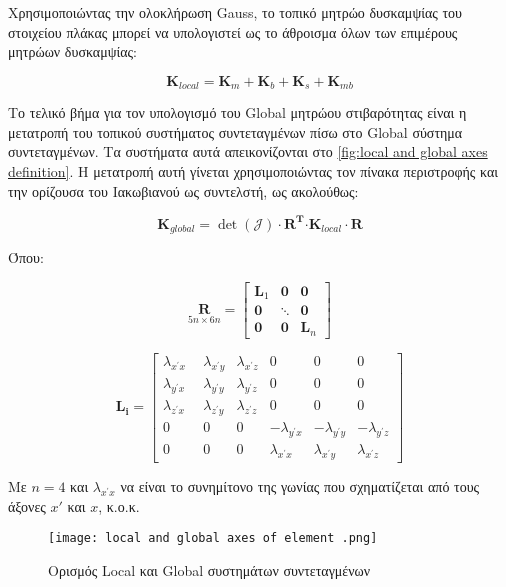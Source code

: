 Χρησιμοποιώντας την ολοκλήρωση \textlatin{Gauss}, το τοπικό μητρώο δυσκαμψίας του στοιχείου πλάκας μπορεί να υπολογιστεί ως το άθροισμα όλων των επιμέρους μητρώων δυσκαμψίας:

\begin{equation}
\mathbf{K}_{local} = \mathbf{K}_{m} + \mathbf{K}_{b} + \mathbf{K}_{s} + \mathbf{K}_{mb}
\end{equation}

Το τελικό βήμα για τον υπολογισμό του \textlatin{Global} μητρώου στιβαρότητας	είναι η μετατροπή του τοπικού συστήματος συντεταγμένων πίσω στο  \textlatin{Global} σύστημα συντεταγμένων. Τα συστήματα αυτά απεικονίζονται στο \autoref{fig:local and global axes definition}. H μετατροπή αυτή γίνεται χρησιμοποιώντας τον πίνακα περιστροφής και την ορίζουσα του Ιακωβιανού ως συντελστή, ως ακολούθως:

\begin{equation}
\mathbf{K}_{global} = \det\left( \mathcal{J} \right) \cdot \mathbf{R}^{\mathbf{T}}\mathbf{\cdot}\mathbf{K}_{local} \cdot \mathbf{R}
\end{equation}

Όπου:

\[
\underset{\text{$5n \times 6n$}}{\mathbf{R}} =
\begin{bmatrix}
\mathbf{L}_{1} & \mathbf{0} & \mathbf{0} \\
\mathbf{0} & \ddots & \mathbf{0} \\
\mathbf{0} & \mathbf{0} & \mathbf{L}_{n}
\end{bmatrix}
\]



\[\mathbf{L_i}=
\begin{bmatrix}
\lambda_{x^{'}x}\ \  & \lambda_{x^{'}y} & \lambda_{x^{'}z} & 0 & 0 & 0 \\
\lambda_{y^{'}x} & \lambda_{y^{'}y} & \lambda_{y^{'}z} & 0 & 0 & 0 \\
\lambda_{z^{'}x} & \lambda_{z^{'}y} & \lambda_{z^{'}z} & 0 & 0 & 0 \\
0 & 0 & 0 & - \lambda_{y^{'}x} & - \lambda_{y^{'}y} & - \lambda_{y^{'}z} \\
0 & 0 & 0 & \lambda_{x^{'}x} & \lambda_{x^{'}y} & \lambda_{x^{'}z}
\end{bmatrix}\]


Με $n = 4$ και $\lambda_{x^{'}x}$ να είναι το συνημίτονο της γωνίας που σχηματίζεται από τους άξονες $x'$ και $x$, κ.ο.κ.

\begin{figure}[H]
    \centering
    \texttt{[image: local and global axes of element .png]}
    \caption{Ορισμός \textlatin{Local} και \textlatin{Global} συστημάτων συντεταγμένων \cite{onate2013}}
    \label{fig:local and global axes definition}
\end{figure}


